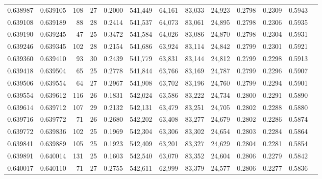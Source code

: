 \begin{tabular}{rrrrrrrrrrrrr}
0.638987 & 0.639105 & 108 &  27 &                                     0.2000 & 541,449 &  64,161 &  83,033 &  24,923 & 0.2798 & 0.2309 & 0.5943 \\
0.639108 & 0.639189 &  88 &  28 &                                     0.2414 & 541,537 &  64,073 &  83,061 &  24,895 & 0.2798 & 0.2306 & 0.5935 \\
0.639190 & 0.639245 &  47 &  25 &                                     0.3472 & 541,584 &  64,026 &  83,086 &  24,870 & 0.2798 & 0.2304 & 0.5931 \\
0.639246 & 0.639345 & 102 &  28 &                                     0.2154 & 541,686 &  63,924 &  83,114 &  24,842 & 0.2799 & 0.2301 & 0.5921 \\
0.639360 & 0.639410 &  93 &  30 &                                     0.2439 & 541,779 &  63,831 &  83,144 &  24,812 & 0.2799 & 0.2298 & 0.5913 \\
0.639418 & 0.639504 &  65 &  25 &                                     0.2778 & 541,844 &  63,766 &  83,169 &  24,787 & 0.2799 & 0.2296 & 0.5907 \\
0.639506 & 0.639554 &  64 &  27 &                                     0.2967 & 541,908 &  63,702 &  83,196 &  24,760 & 0.2799 & 0.2294 & 0.5901 \\
0.639554 & 0.639612 & 116 &  26 &                                     0.1831 & 542,024 &  63,586 &  83,222 &  24,734 & 0.2800 & 0.2291 & 0.5890 \\
0.639614 & 0.639712 & 107 &  29 &                                     0.2132 & 542,131 &  63,479 &  83,251 &  24,705 & 0.2802 & 0.2288 & 0.5880 \\
0.639716 & 0.639772 &  71 &  26 &                                     0.2680 & 542,202 &  63,408 &  83,277 &  24,679 & 0.2802 & 0.2286 & 0.5874 \\
0.639772 & 0.639836 & 102 &  25 &                                     0.1969 & 542,304 &  63,306 &  83,302 &  24,654 & 0.2803 & 0.2284 & 0.5864 \\
0.639841 & 0.639889 & 105 &  25 &                                     0.1923 & 542,409 &  63,201 &  83,327 &  24,629 & 0.2804 & 0.2281 & 0.5854 \\
0.639891 & 0.640014 & 131 &  25 &                                     0.1603 & 542,540 &  63,070 &  83,352 &  24,604 & 0.2806 & 0.2279 & 0.5842 \\
0.640017 & 0.640110 &  71 &  27 &                                     0.2755 & 542,611 &  62,999 &  83,379 &  24,577 & 0.2806 & 0.2277 & 0.5836 \\

\end{tabular}
